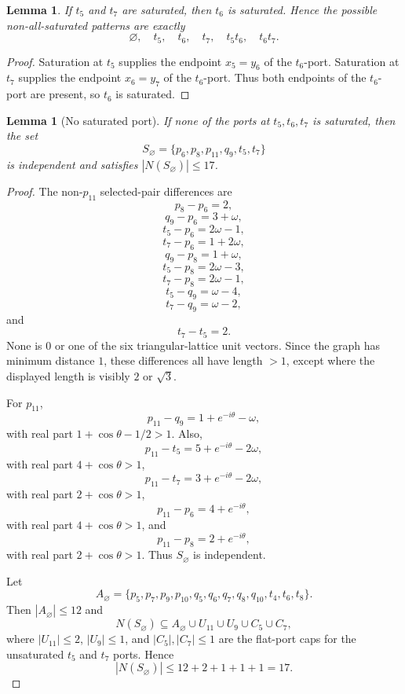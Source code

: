 \documentclass[11pt]{article}
\newtheorem{lemma}[theorem]{Lemma}
\begin{document}
\begin{lemma}\label{lem:flat-patterns}
If $t_5$ and $t_7$ are saturated, then $t_6$ is saturated. Hence the possible non-all-saturated patterns are exactly
\[
\varnothing,
 \quad t_5,
 \quad t_6,
 \quad t_7,
 \quad t_5t_6,
 \quad t_6t_7.
\]
\end{lemma}

\begin{proof}
Saturation at $t_5$ supplies the endpoint $x_5=y_6$ of the $t_6$-port. Saturation at $t_7$ supplies the endpoint $x_6=y_7$ of the $t_6$-port. Thus both endpoints of the $t_6$-port are present, so $t_6$ is saturated.
\end{proof}

\begin{lemma}[No saturated port]\label{lem:row0}
If none of the ports at $t_5,t_6,t_7$ is saturated, then the set
\[
 S_{\varnothing}=\{p_6,p_8,p_{11},q_9,t_5,t_7\}
\]
is independent and satisfies $|N(S_{\varnothing})|\le17$.
\end{lemma}

\begin{proof}
The non-$p_{11}$ selected-pair differences are
\[
 p_8-p_6=2,
\]
\[
 q_9-p_6=3+\omega,
\]
\[
 t_5-p_6=2\omega-1,
\]
\[
 t_7-p_6=1+2\omega,
\]
\[
 q_9-p_8=1+\omega,
\]
\[
 t_5-p_8=2\omega-3,
\]
\[
 t_7-p_8=2\omega-1,
\]
\[
 t_5-q_9=\omega-4,
\]
\[
 t_7-q_9=\omega-2,
\]
and
\[
 t_7-t_5=2.
\]
None is $0$ or one of the six triangular-lattice unit vectors. Since the graph has minimum distance $1$, these differences all have length $>1$, except where the displayed length is visibly $2$ or $\sqrt3$.

For $p_{11}$,
\[
 p_{11}-q_9=1+e^{-i\theta}-\omega,
\]
with real part $1+\cos\theta-1/2>1$.
Also,
\[
 p_{11}-t_5=5+e^{-i\theta}-2\omega,
\]
with real part $4+\cos\theta>1$,
\[
 p_{11}-t_7=3+e^{-i\theta}-2\omega,
\]
with real part $2+\cos\theta>1$,
\[
 p_{11}-p_6=4+e^{-i\theta},
\]
with real part $4+\cos\theta>1$, and
\[
 p_{11}-p_8=2+e^{-i\theta},
\]
with real part $2+\cos\theta>1$. Thus $S_{\varnothing}$ is independent.

Let
\[
A_{\varnothing}=\{p_5,p_7,p_9,p_{10},q_5,q_6,q_7,q_8,q_{10},t_4,t_6,t_8\}.
\]
Then $|A_{\varnothing}|\le12$ and
\[
 N(S_{\varnothing})\subseteq A_{\varnothing}\cup U_{11}\cup U_9\cup C_5\cup C_7,
\]
where $|U_{11}|\le2$, $|U_9|\le1$, and $|C_5|,|C_7|\le1$ are the flat-port caps for the unsaturated $t_5$ and $t_7$ ports. Hence
\[
 |N(S_{\varnothing})|\le12+2+1+1+1=17.
\]
\end{proof}
\end{document}
